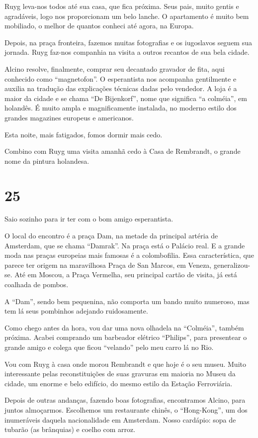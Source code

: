 Ruyg leva-nos todos até sua casa, que fica próxima. Seus pais, muito gentis e agradáveis, logo nos proporcionam um belo lanche. O apartamento é muito bem mobiliado, o melhor de quantos conheci até agora, na Europa.

Depois, na praça fronteira, fazemos muitas fotografias e os iugoslavos seguem sua jornada. Ruyg faz-nos companhia na visita a outros recantos de sua bela cidade.

Alcino resolve, finalmente, comprar seu decantado gravador de fita, aqui conhecido como ``magnetofon''. O esperantista nos acompanha gentilmente e auxilia na tradução das explicações técnicas dadas pelo vendedor. A loja é a maior da cidade e se chama ``De Bijenkorf'', nome que significa ``a colméia'', em holandês. É muito ampla e magnificamente instalada, no moderno estilo dos grandes magazines europeus e americanos.

Esta noite, mais fatigados, fomos dormir mais cedo.

Combino com Ruyg uma visita amanhã cedo à Casa de Rembrandt, o grande nome da pintura holandesa.

\section*{25 \adfflatleafright {}}
Saio sozinho para ir ter com o bom amigo esperantista.

O local do encontro é a praça Dam, na metade da principal artéria de Amsterdam, que se chama ``Damrak''. Na praça está o Palácio real. E a grande moda nas praças europeias mais famosas é a colombofilia. Essa característica, que parece ter origem na maravilhosa Praça de San Marcos, em Veneza, generalizou-se. Até em Moscou, a Praça Vermelha, seu principal cartão de visita, já está coalhada de pombos.

A ``Dam'', sendo bem pequenina, não comporta um bando muito numeroso, mas tem lá seus pombinhos adejando ruidosamente.

Como chego antes da hora, vou dar uma nova olhadela na ``Colméia'', também próxima. Acabei comprando um barbeador elétrico ``Philips'', para presentear o grande amigo e colega que ficou ``velando'' pelo meu carro lá no Rio.

Vou com Ruyg à casa onde morou Rembrandt e que hoje é o seu museu. Muito interessante pelas reconstituições de suas gravuras em maioria no Museu da cidade, um enorme e belo edifício, do mesmo estilo da Estação Ferroviária.

Depois de outras andanças, fazendo boas fotografias, encontramos Alcino, para juntos almoçarmos. Escolhemos um restaurante chinês, o ``Hong-Kong'', um dos inumeráveis daquela nacionalidade em Amsterdam. Nosso cardápio: sopa de tubarão (as brânquias) e coelho com arroz.

